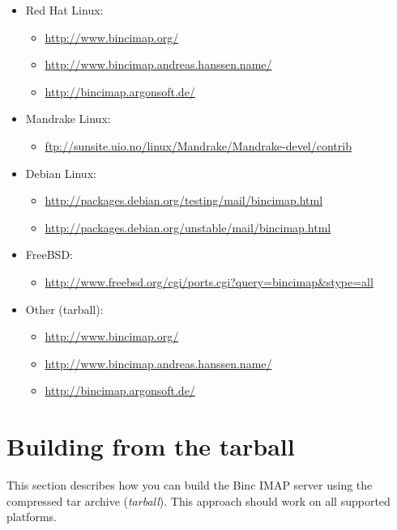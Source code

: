\documentclass[11pt,a4paper,twoside,openright]{report}
\begin{document}
\begin{itemize}

\item Red Hat Linux:
  \begin{itemize}
  \item \url{http://www.bincimap.org/}
  \item \url{http://www.bincimap.andreas.hanssen.name/}
  \item \url{http://bincimap.argonsoft.de/}
  \end{itemize}

\item Mandrake Linux:
  \begin{itemize}
  \item \url{ftp://sunsite.uio.no/linux/Mandrake/Mandrake-devel/contrib}
  \end{itemize}

\item Debian Linux:
  \begin{itemize}
  \item \url{http://packages.debian.org/testing/mail/bincimap.html}
  \item \url{http://packages.debian.org/unstable/mail/bincimap.html}
  \end{itemize}

\item FreeBSD:
  \begin{itemize}
  \item \url{http://www.freebsd.org/cgi/ports.cgi?query=bincimap&stype=all}
  \end{itemize}

\item Other (tarball):
  \begin{itemize}
  \item \url{http://www.bincimap.org/}
  \item \url{http://www.bincimap.andreas.hanssen.name/}
  \item \url{http://bincimap.argonsoft.de/}
  \end{itemize}

\end{itemize}

\section{Building from the tarball}
\label{buildfromtarball}

This section describes how you can build the Binc IMAP server using
the compressed tar archive (\textit{tarball}). This approach should
work on all supported platforms.
\end{document}
